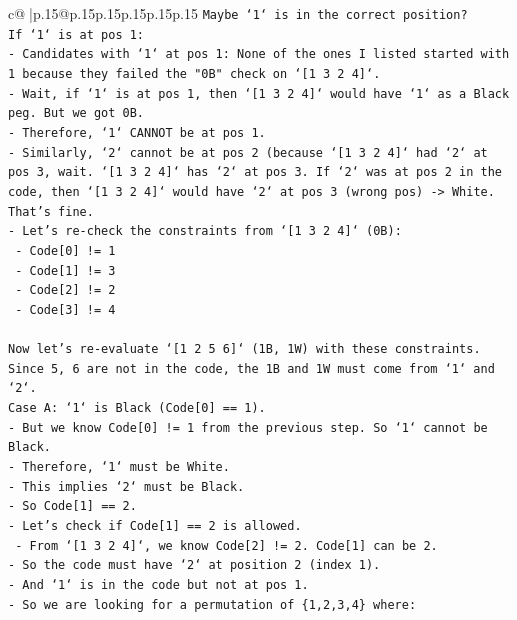 \documentclass{article}
\begin{document}
{\begin{supertabular}{c@{$\;$}|p{.15\linewidth}@{}p{.15\linewidth}p{.15\linewidth}p{.15\linewidth}p{.15\linewidth}p{.15\linewidth}}
{{{\texttt{Maybe `1` is in the correct position?} \\
\texttt{If `1` is at pos 1:} \\
\texttt{{-} Candidates with `1` at pos 1: None of the ones I listed started with 1 because they failed the "0B" check on `{[}1 3 2 4{]}`.} \\
\texttt{{-} Wait, if `1` is at pos 1, then `{[}1 3 2 4{]}` would have `1` as a Black peg. But we got 0B.} \\
\texttt{{-} Therefore, `1` CANNOT be at pos 1.} \\
\texttt{{-} Similarly, `2` cannot be at pos 2 (because `{[}1 3 2 4{]}` had `2` at pos 3, wait. `{[}1 3 2 4{]}` has `2` at pos 3. If `2` was at pos 2 in the code, then `{[}1 3 2 4{]}` would have `2` at pos 3 (wrong pos) {-}> White. That's fine.} \\
\texttt{{-} Let's re{-}check the constraints from `{[}1 3 2 4{]}` (0B):} \\
\texttt{  {-} Code{[}0{]} != 1} \\
\texttt{  {-} Code{[}1{]} != 3} \\
\texttt{  {-} Code{[}2{]} != 2} \\
\texttt{  {-} Code{[}3{]} != 4} \\
\\ 
\texttt{Now let's re{-}evaluate `{[}1 2 5 6{]}` (1B, 1W) with these constraints.} \\
\texttt{Since 5, 6 are not in the code, the 1B and 1W must come from `1` and `2`.} \\
\texttt{Case A: `1` is Black (Code{[}0{]} == 1).} \\
\texttt{{-} But we know Code{[}0{]} != 1 from the previous step. So `1` cannot be Black.} \\
\texttt{{-} Therefore, `1` must be White.} \\
\texttt{{-} This implies `2` must be Black.} \\
\texttt{{-} So Code{[}1{]} == 2.} \\
\texttt{{-} Let's check if Code{[}1{]} == 2 is allowed.} \\
\texttt{  {-} From `{[}1 3 2 4{]}`, we know Code{[}2{]} != 2. Code{[}1{]} can be 2.} \\
\texttt{{-} So the code must have `2` at position 2 (index 1).} \\
\texttt{{-} And `1` is in the code but not at pos 1.} \\
\texttt{{-} So we are looking for a permutation of \{1,2,3,4\} where:} \\
}}}
\end{supertabular}}
\end{document}

